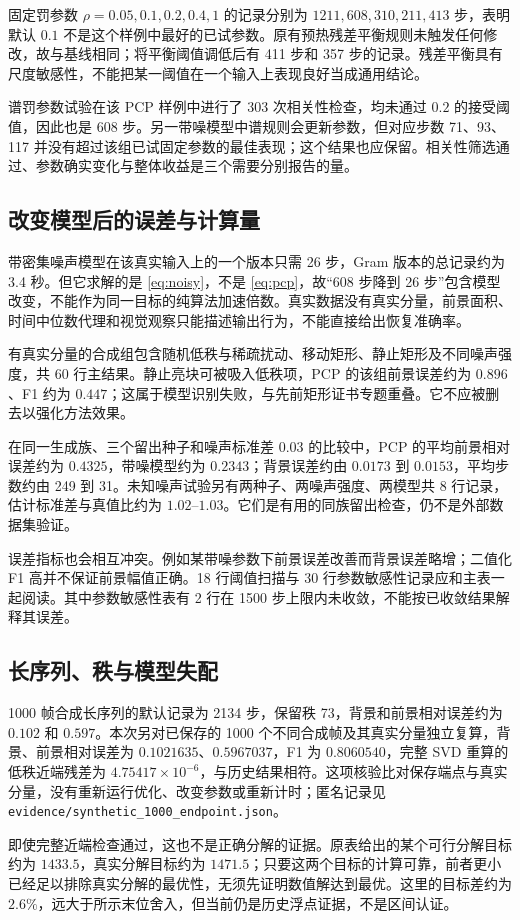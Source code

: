 \documentclass[UTF8,fontset=none,zihao=-4,a4paper]{ctexart}
\theoremstyle{plainzh}
\numberwithin{equation}{section}
\begin{document}
固定罚参数 $\rho=0.05,0.1,0.2,0.4,1$ 的记录分别为 $1211,608,310,211,413$ 步，表明默认 $0.1$ 不是这个样例中最好的已试参数。原有预热残差平衡规则未触发任何修改，故与基线相同；将平衡阈值调低后有 411 步和 357 步的记录。残差平衡具有尺度敏感性，不能把某一阈值在一个输入上表现良好当成通用结论\cite{wohlberg}。

谱罚参数试验在该 PCP 样例中进行了 303 次相关性检查，均未通过 $0.2$ 的接受阈值，因此也是 608 步。另一带噪模型中谱规则会更新参数，但对应步数 71、93、117 并没有超过该组已试固定参数的最佳表现；这个结果也应保留。相关性筛选通过、参数确实变化与整体收益是三个需要分别报告的量。

\subsection{改变模型后的误差与计算量}
带密集噪声模型在该真实输入上的一个版本只需 26 步，Gram 版本的总记录约为 3.4 秒。但它求解的是 \eqref{eq:noisy}，不是 \eqref{eq:pcp}，故“608 步降到 26 步”包含模型改变，不能作为同一目标的纯算法加速倍数。真实数据没有真实分量，前景面积、时间中位数代理和视觉观察只能描述输出行为，不能直接给出恢复准确率。

有真实分量的合成组包含随机低秩与稀疏扰动、移动矩形、静止矩形及不同噪声强度，共 60 行主结果。静止亮块可被吸入低秩项，PCP 的该组前景误差约为 $0.896$、F1 约为 $0.447$；这属于模型识别失败，与先前矩形证书专题重叠。它不应被删去以强化方法效果。

在同一生成族、三个留出种子和噪声标准差 $0.03$ 的比较中，PCP 的平均前景相对误差约为 $0.4325$，带噪模型约为 $0.2343$；背景误差约由 $0.0173$ 到 $0.0153$，平均步数约由 249 到 31。未知噪声试验另有两种子、两噪声强度、两模型共 8 行记录，估计标准差与真值比约为 $1.02$--$1.03$。它们是有用的同族留出检查，仍不是外部数据集验证。

误差指标也会相互冲突。例如某带噪参数下前景误差改善而背景误差略增；二值化 F1 高并不保证前景幅值正确。18 行阈值扫描与 30 行参数敏感性记录应和主表一起阅读。其中参数敏感性表有 2 行在 1500 步上限内未收敛，不能按已收敛结果解释其误差。

\subsection{长序列、秩与模型失配}
1000 帧合成长序列的默认记录为 2134 步，保留秩 73，背景和前景相对误差约为 $0.102$ 和 $0.597$。本次另对已保存的 1000 个不同合成帧及其真实分量独立复算，背景、前景相对误差为 $0.1021635$、$0.5967037$，F1 为 $0.8060540$，完整 SVD 重算的低秩近端残差为 $4.75417\times10^{-6}$，与历史结果相符。这项核验比对保存端点与真实分量，没有重新运行优化、改变参数或重新计时；匿名记录见 \texttt{evidence/synthetic\_1000\_endpoint.json}。\par
即使完整近端检查通过，这也不是正确分解的证据。原表给出的某个可行分解目标约为 $1433.5$，真实分解目标约为 $1471.5$；只要这两个目标的计算可靠，前者更小已经足以排除真实分解的最优性，无须先证明数值解达到最优。这里的目标差约为 $2.6\%$，远大于所示末位舍入，但当前仍是历史浮点证据，不是区间认证。
\end{document}
